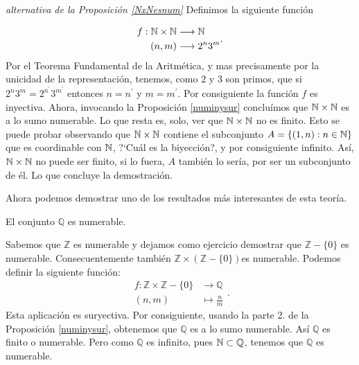 \begin{demo} \emph{alternativa de la Proposición \ref{NxNesnum}}
Definimos la siguiente función

\[
\begin{split}
f:\mathbb{N}\times\mathbb{N}&\longrightarrow\mathbb{N}\\
 (n,m)&\longrightarrow 2^n3^m\\
 \end{split}.
 \]
Por el Teorema Fundamental de la Aritmética, y mas precisamente
por la unicidad de la representación, tenemos, como $2$ y $3$
son primos, que si $2^n3^m=2^{n^{\prime}}3^{m^{\prime}}$ entonces
$n=n^{\prime}$ y $m=m^{\prime}$. Por consiguiente la función $f$
es inyectiva. Ahora, invocando la Proposición \vref{numinysur}
concluímos que $\mathbb{N}\times\mathbb{N}$ es a lo sumo numerable. Lo que
resta es, solo, ver que $\mathbb{N}\times\mathbb{N}$ no es finito. Esto se puede
probar observando que $\mathbb{N}\times\mathbb{N}$ contiene el subconjunto
$A=\{(1,n):n\in\mathbb{N}\}$ que es coordinable con $\mathbb{N}$, ?`Cuál es la
biyección?, y por consiguiente infinito. Así,
$\mathbb{N}\times\mathbb{N}$ no puede ser finito, si lo fuera, $A$ también lo
sería, por ser un subconjunto de él. Lo que concluye la
demostración.
\end{demo}

Ahora podemos demostrar  uno de los resultados más interesantes
de esta teoría.
\begin{teorema}{} El conjunto $\mathbb{Q}$ es numerable.
\end{teorema}
\begin{demo} Sabemos que $\mathbb{Z}$ es numerable y dejamos como ejercicio demostrar que $\mathbb{Z}-\{0\}$ es numerable. Consecuentemente también  $\mathbb{Z}\times\left(\mathbb{Z}-\{0\}\right) $es numerable. Podemos
definir la siguiente función:
\[
\begin{split}
f:\mathbb{Z}\times\mathbb{Z}-\{0\}&\longrightarrow\mathbb{Q}\\
(n,m)&\longmapsto \frac{n}{m}
\end{split}
.\] Esta aplicación es suryectiva. Por consiguiente, usando la
parte 2. de la Proposición \vref{numinysur}, obtenemos que
$\mathbb{Q}$ es a lo sumo numerable. Así $\mathbb{Q}$ es
finito o numerable. Pero como $\mathbb{Q}$ es infinito, pues
$\mathbb{N}\subset\mathbb{Q}$, tenemos que $\mathbb{Q}$ es numerable. \end{demo}



